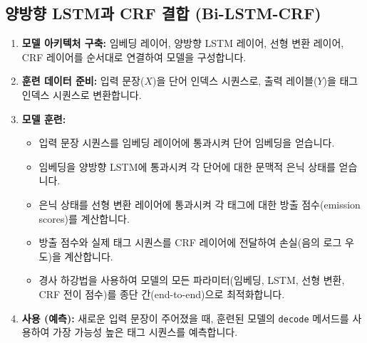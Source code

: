 \documentclass[11pt,a4paper]{article}
\begin{document}
\subsection{양방향 LSTM과 CRF 결합 (Bi-LSTM-CRF)}
\begin{enumerate}
    \item \textbf{모델 아키텍처 구축:} 임베딩 레이어, 양방향 LSTM 레이어, 선형 변환 레이어, CRF 레이어를 순서대로 연결하여 모델을 구성합니다.
    \item \textbf{훈련 데이터 준비:} 입력 문장($X$)을 단어 인덱스 시퀀스로, 출력 레이블($Y$)을 태그 인덱스 시퀀스로 변환합니다.
    \item \textbf{모델 훈련:}
    \begin{itemize}
        \item 입력 문장 시퀀스를 임베딩 레이어에 통과시켜 단어 임베딩을 얻습니다.
        \item 임베딩을 양방향 LSTM에 통과시켜 각 단어에 대한 문맥적 은닉 상태를 얻습니다.
        \item 은닉 상태를 선형 변환 레이어에 통과시켜 각 태그에 대한 방출 점수(emission scores)를 계산합니다.
        \item 방출 점수와 실제 태그 시퀀스를 CRF 레이어에 전달하여 손실(음의 로그 우도)을 계산합니다.
        \item 경사 하강법을 사용하여 모델의 모든 파라미터(임베딩, LSTM, 선형 변환, CRF 전이 점수)를 종단 간(end-to-end)으로 최적화합니다.
    \end{itemize}
    \item \textbf{사용 (예측):} 새로운 입력 문장이 주어졌을 때, 훈련된 모델의 \texttt{decode} 메서드를 사용하여 가장 가능성 높은 태그 시퀀스를 예측합니다.
\end{enumerate}
\end{document}
